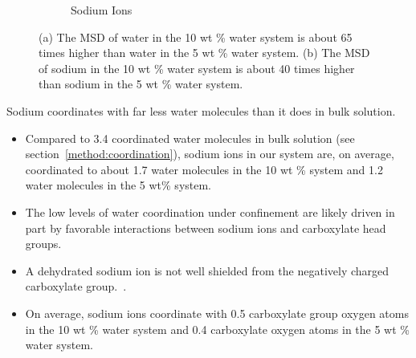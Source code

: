 \documentclass{article}
\begin{document}
\begin{figure}[!htb]
\begin{subfigure}{0.45\textwidth}
  \caption{Sodium Ions}\label{fig:na_msd_comparison}
  \end{subfigure}
  \caption{(a) The MSD of water in the 10 wt \% water system is about 65 times
  higher than water in the 5 wt \% water system. (b) The MSD of sodium in the
  10 wt \% water system is about 40 times higher than sodium in the 5 wt \% 
  water system.}\label{fig:msd_comparison}
  \end{figure}
  
  \noindent Sodium coordinates with far less water molecules than it does in 
  bulk solution.
  \begin{itemize}
    \item Compared to 3.4 coordinated water molecules in bulk solution (see 
    section~\ref{method:coordination}), sodium ions in our system are, on average,
    coordinated to about 1.7 water molecules in the 10 wt \% system and 1.2 water
    molecules in the 5 wt\% system.
    \item The low levels of water coordination under confinement are likely driven
    in part by favorable interactions between sodium ions and carboxylate head groups.
    \item A dehydrated sodium ion is not well shielded from the negatively charged 
    carboxylate group.~\cite{ma_drastically_2019}. 
    \item On average, sodium ions coordinate with 0.5 carboxylate group oxygen atoms in the
    10 wt \% water system and 0.4 carboxylate oxygen atoms in the 5 wt \% water system. 
  \end{itemize}
  
  
\end{document}
